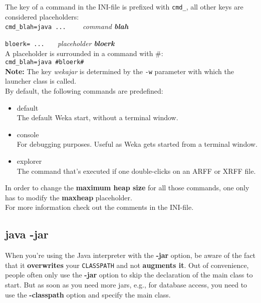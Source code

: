 The key of a command in the INI-file is prefixed with \verb=cmd_=, all
other keys are considered placeholders:\\

\verb^cmd_blah=java ...    ^ \emph{command \textbf{blah}}

\verb^bloerk= ...   ^ \emph{placeholder \textbf{bloerk}}\\

\noindent A placeholder is surrounded in a command with \#:\\

\verb^cmd_blah=java #bloerk#^\\

\noindent \textbf{Note:} The key \emph{wekajar} is determined by the
\texttt{-w} parameter with which the launcher class is called.\\

\noindent By default, the following commands are predefined:

\begin{itemize}
\item default\\ The default Weka start, without a terminal window.
\item console\\ For debugging purposes. Useful as Weka gets started from a terminal window.
\item explorer\\ The command that's executed if one double-clicks on an ARFF or XRFF file.
\end{itemize}

\noindent In order to change the \textbf{maximum heap size} for all those commands, one only has
to modify the \textbf{maxheap} placeholder.\\

\noindent For more information check out the comments in the INI-file.

\subsection{java -jar}

When you're using the Java interpreter with the \textbf{-jar} option,
be aware of the fact that it \textbf{overwrites} your \verb=CLASSPATH=
and not \textbf{augments it}. Out of convenience, people often only
use the \textbf{-jar} option to skip the declaration of the main class to
start. But as soon as you need more jars, e.g., for database access,
you need to use the \textbf{-classpath} option and specify the main class.\\

